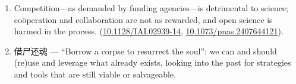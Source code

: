 \documentclass[School=EMC]{Dissertate}
\newcommand{\zz}[1]{{\footnotesize\ttfamily \href{https://doi.org/#1}{#1}}}
\begin{document}
\begin{enumerate}
% 


\item Competition---as demanded by funding agencies---is detrimental to science; coöperation and collaboration are not as rewarded, and open science is harmed in the process. (\zz{10.1128/IAI.02939-14}, \zz{10.1073/pnas.2407644121}).




\item {\fontQiji{}借尸还魂} --- ``Borrow a corpse to resurrect the soul'': we can and should (re)use and leverage what already exists, looking into the past for strategies and tools that are still viable or salvageable.



\end{enumerate}

\end{document}
